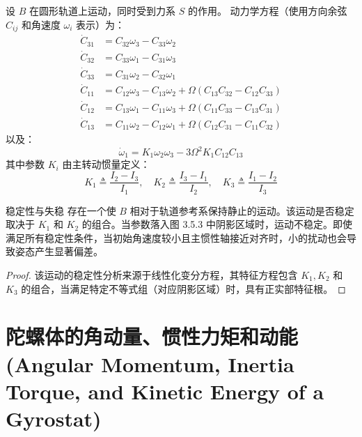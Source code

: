 设 \(B\) 在圆形轨道上运动，同时受到力系 \(S\) 的作用。
动力学方程（使用方向余弦 \(C_{ij}\) 和角速度 \(\omega_i\) 表示）为：
\begin{align}
\dot{C}_{31} &= C_{32}\omega_3 - C_{33}\omega_2 \tag{4} \\
\dot{C}_{32} &= C_{33}\omega_1 - C_{31}\omega_3 \tag{5} \\
\dot{C}_{33} &= C_{31}\omega_2 - C_{32}\omega_1 \tag{6} \\
\dot{C}_{11} &= C_{12}\omega_3 - C_{13}\omega_2 + \Omega(C_{13}C_{32} - C_{12}C_{33}) \tag{7} \\
\dot{C}_{12} &= C_{13}\omega_1 - C_{11}\omega_3 + \Omega(C_{11}C_{33} - C_{13}C_{31}) \tag{8} \\
\dot{C}_{13} &= C_{11}\omega_2 - C_{12}\omega_1 + \Omega(C_{12}C_{31} - C_{11}C_{32}) \tag{9}
\end{align}
以及：
\begin{equation}
\dot{\omega}_1 = K_1\omega_2\omega_3 - 3\Omega^2 K_1 C_{12}C_{13} \tag{10}
\end{equation}
其中参数 \(K_i\) 由主转动惯量定义：
\begin{equation}
K_1 \triangleq \frac{I_2 - I_3}{I_1}, \quad K_2 \triangleq \frac{I_3 - I_1}{I_2}, \quad K_3 \triangleq \frac{I_1 - I_2}{I_3} \tag{16}
\end{equation}

\begin{myTheorem}{稳定性与失稳}
存在一个使 \(B\) 相对于轨道参考系保持静止的运动。该运动是否稳定取决于 \(K_1\) 和 \(K_2\) 的组合。当参数落入图 3.5.3 中阴影区域时，运动不稳定。即使满足所有稳定性条件，当初始角速度较小且主惯性轴接近对齐时，小的扰动也会导致姿态产生显著偏差。
\end{myTheorem}
\begin{proof}
该运动的稳定性分析来源于线性化变分方程，其特征方程包含 \(K_1, K_2\) 和 \(K_3\) 的组合，当满足特定不等式组（对应阴影区域）时，具有正实部特征根。
\end{proof}

\section{陀螺体的角动量、惯性力矩和动能 (Angular Momentum, Inertia Torque, and Kinetic Energy of a Gyrostat)}

